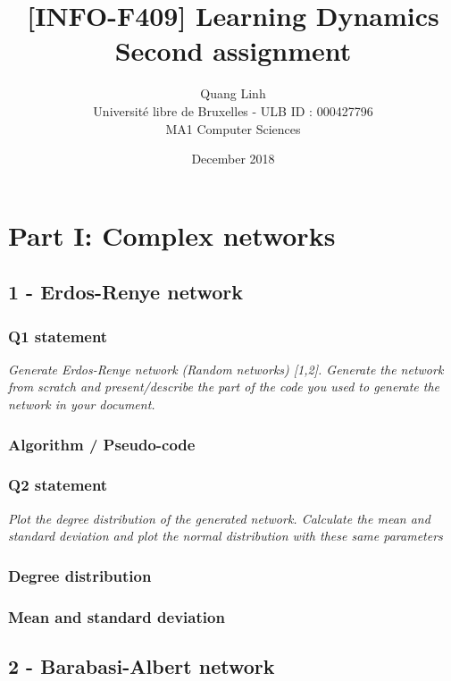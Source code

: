 \documentclass{article}
\title{[INFO-F409] Learning Dynamics \\ Second assignment}
\author{\bsc{BUI QUANG PHUONG} Quang Linh \\ Université libre de Bruxelles - ULB ID : 000427796  \\ MA1 Computer Sciences}
\date{December 2018}
\begin{document}
\maketitle

\tableofcontents

\newpage
\section{Part I: Complex networks}

\subsection{1 - Erdos-Renye network}

\subsubsection{Q1 statement}

\textit{Generate Erdos-Renye network (Random networks) [1,2]. Generate the network from scratch and present/describe the part of the code you used to generate the network in your document.} 

\subsubsection*{Algorithm / Pseudo-code}

\subsubsection{Q2 statement}

\textit{Plot the degree distribution of the generated network. Calculate the mean and standard deviation and plot the normal distribution with these same parameters}

\subsubsection*{Degree distribution}

\subsubsection*{Mean and standard deviation}

\subsection{2 - Barabasi-Albert network}
\end{document}

